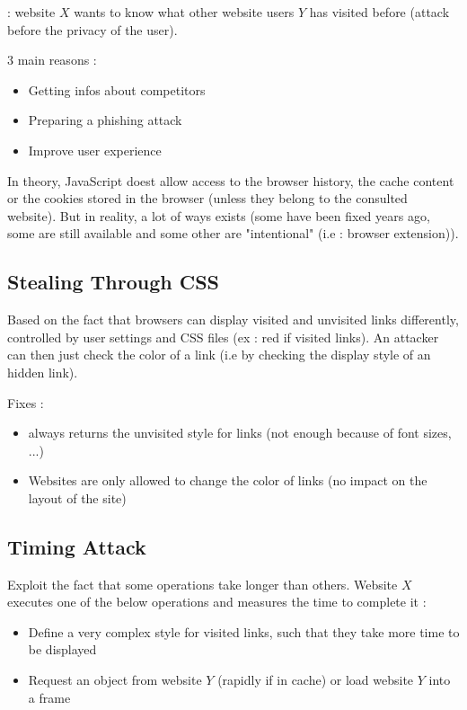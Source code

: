  : website $X$ wants to know what other website users $Y$ has visited before (attack before the privacy of the user).

3 main reasons :
\begin{itemize}
    \item Getting infos about competitors
    \item Preparing a phishing attack
    \item Improve user experience
\end{itemize}

In theory, JavaScript doest allow access to the browser history, the cache content or the cookies stored in the browser (unless they belong to the consulted website). But in reality, a lot of ways exists (some have been fixed years ago, some are still available and some other are "intentional" (i.e : browser extension)).

\subsection{Stealing Through CSS}

Based on the fact that browsers can display visited and unvisited links differently, controlled by user settings and CSS files (ex : red if visited links). An attacker can then just check the color of a link (i.e by checking the display style of an hidden link).

Fixes :
\begin{itemize}
    \item {} always returns the unvisited style for links (not enough because of font sizes, ...)
    \item Websites are only allowed to change the color of links (no impact on the layout of the site)
\end{itemize}

\subsection{Timing Attack}

Exploit the fact that some operations take longer than others. Website $X$ executes one of the below operations and measures the time to complete it :
\begin{itemize}
    \item Define a very complex style for visited links, such that they take more time to be displayed
    \item Request an object from website $Y$ (rapidly if in cache) or load website $Y$ into a frame
\end{itemize}

